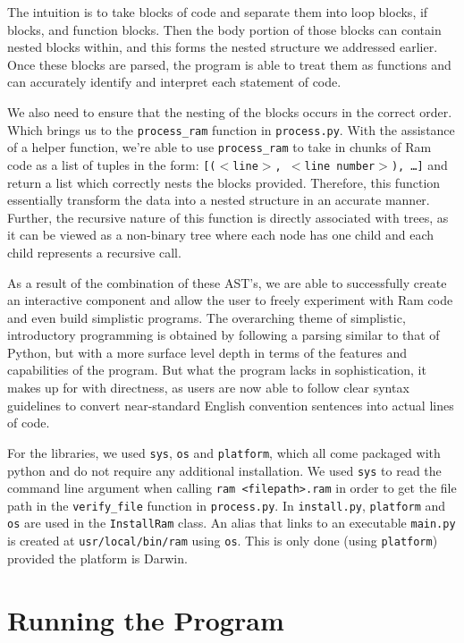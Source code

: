 \documentclass[fontsize=11pt]{article}
\begin{document}
\noindent The intuition is to take blocks of code and separate them into loop blocks, if blocks, and function blocks. Then the body portion of those blocks can contain nested blocks within, and this forms the nested structure we addressed earlier. Once these blocks are parsed, the program is able to treat them as functions and can accurately identify and interpret each statement of code. 

We also need to ensure that the nesting of the blocks occurs in the correct order. Which brings us to the \texttt{process\_ram} function in \texttt{process.py}. With the assistance of a helper function, we're able to use \texttt{process\_ram} to take in chunks of Ram code as a list of tuples in the form: \texttt{[($<$line$>$, $<$line number$>$), \dots]} and return a list which correctly nests the blocks provided. Therefore, this function essentially transform the data into a nested structure in an accurate manner. Further, the recursive nature of this function is directly associated with trees, as it can be viewed as a non-binary tree where each node has one child and each child represents a recursive call. 

As a result of the combination of these AST's, we are able to successfully create an interactive component and allow the user to freely experiment with Ram code and even build simplistic programs. The overarching theme of simplistic, introductory programming is obtained by following a parsing similar to that of Python, but with a more surface level depth in terms of the features and capabilities of the program. But what the program lacks in sophistication, it makes up for with directness, as users are now able to follow clear syntax guidelines to convert near-standard English convention sentences into actual lines of code. 

For the libraries, we used \texttt{sys}, \texttt{os} and \texttt{platform}, which all come packaged with python and do not require any additional installation. We used \texttt{sys} to read the command line argument when calling \texttt{ram <filepath>.ram} in order to get the file path in the \texttt{verify\_file} function in \texttt{process.py}. In \texttt{install.py}, \texttt{platform} and \texttt{os} are used in the \texttt{InstallRam} class. An alias that links to an executable \texttt{main.py} is created at \texttt{usr/local/bin/ram} using \texttt{os}. This is only done (using \texttt{platform}) provided the platform is Darwin.


\section*{Running the Program}
\end{document}
